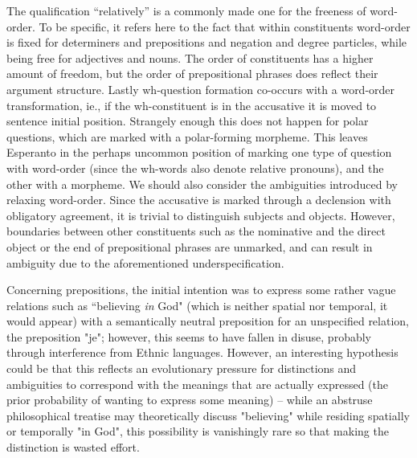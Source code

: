\documentclass[10pt,a4paper]{article}
\begin{document}
The qualification ``relatively'' is a commonly made one for the freeness of
word-order. To be specific, it refers here to the fact that within
constituents word-order is fixed for determiners and prepositions and negation
and degree particles, while being free for adjectives and nouns. The order of
constituents has a higher amount of freedom, but the order of prepositional
phrases does reflect their argument structure. Lastly wh-question formation
co-occurs with a word-order transformation, ie., if the wh-constituent is in
the accusative it is moved to sentence initial position.  Strangely enough
this does not happen for polar questions, which are marked with a
polar-forming morpheme. This leaves Esperanto in the perhaps uncommon position
of marking one type of question with word-order (since the wh-words also
denote relative pronouns), and the other with a morpheme. We should also
consider the ambiguities introduced by relaxing word-order. Since the
accusative is marked through a declension with obligatory agreement, it is
trivial to distinguish subjects and objects. However, boundaries between other
constituents such as the nominative and the direct object or the end of
prepositional phrases are unmarked, and can result in ambiguity due to
the aforementioned underspecification.

Concerning prepositions, the initial intention was to express some rather vague
relations such as ``believing {\em in} God" (which is neither spatial nor
temporal, it would appear) with a semantically neutral preposition for an
unspecified relation, the preposition "je"; however, this seems to have fallen
in disuse, probably through interference from Ethnic languages. However, an
interesting hypothesis could be that this reflects an evolutionary pressure for
distinctions and ambiguities to correspond with the meanings that are actually
expressed (the prior probability of wanting to express some meaning) -- while
an abstruse philosophical treatise may theoretically discuss "believing" while
residing spatially or temporally "in God", this possibility is vanishingly rare
so that making the distinction is wasted effort.
\end{document}
